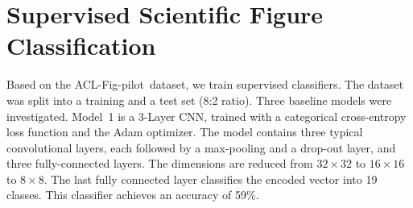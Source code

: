 \documentclass{article}
\newcommand{\scifigp}{{\sc ACL-Fig-pilot}}
\begin{document}





\section{Supervised Scientific Figure Classification}
Based on the \scifigp\ dataset, we train supervised classifiers. The dataset was split into a training and a  test set (8:2 ratio). Three baseline models were investigated. Model~1 is a 3-Layer CNN, trained with a categorical cross-entropy loss function and the Adam optimizer. The model contains three typical convolutional layers, each followed by a max-pooling and a drop-out layer, and three fully-connected layers. The dimensions are reduced from $32\times32$ to $16\times16$ to $8\times8$. The last fully connected layer classifies the encoded vector into 19 classes. 
This classifier achieves an accuracy of 59\%. 
\end{document}
